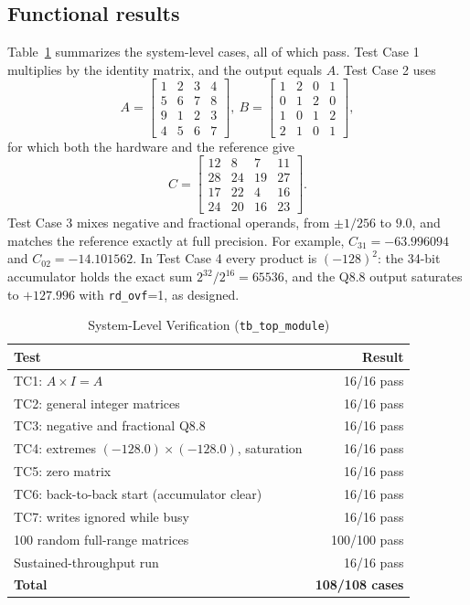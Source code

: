 \documentclass[conference]{IEEEtran}
\begin{document}
\subsection{Functional results}
Table~\ref{tab:tests} summarizes the system-level cases, all of which pass. Test Case 1 multiplies by the identity matrix, and the output equals $A$. Test Case 2 uses
\[
A=\begin{bmatrix}1&2&3&4\\5&6&7&8\\9&1&2&3\\4&5&6&7\end{bmatrix},\ 
B=\begin{bmatrix}1&2&0&1\\0&1&2&0\\1&0&1&2\\2&1&0&1\end{bmatrix},
\]
for which both the hardware and the reference give
\[
C=\begin{bmatrix}12&8&7&11\\28&24&19&27\\17&22&4&16\\24&20&16&23\end{bmatrix}.
\]
Test Case 3 mixes negative and fractional operands, from $\pm1/256$ to $9.0$, and matches the reference exactly at full precision. For example, $C_{31} = -63.996094$ and $C_{02} = -14.101562$. In Test Case 4 every product is $(-128)^2$: the 34-bit accumulator holds the exact sum $2^{32}/2^{16} = 65536$, and the Q8.8 output saturates to $+127.996$ with \texttt{rd\_ovf}=1, as designed.

\begin{table}[t]
\caption{System-Level Verification (\texttt{tb\_top\_module})}
\label{tab:tests}
\centering\footnotesize
\begin{tabular}{@{}lr@{}}
\toprule
Test & Result \\ \midrule
TC1: $A \times I = A$ & 16/16 pass \\
TC2: general integer matrices & 16/16 pass \\
TC3: negative and fractional Q8.8 & 16/16 pass \\
TC4: extremes $(-128.0)\times(-128.0)$, saturation & 16/16 pass \\
TC5: zero matrix & 16/16 pass \\
TC6: back-to-back start (accumulator clear) & 16/16 pass \\
TC7: writes ignored while busy & 16/16 pass \\
100 random full-range matrices & 100/100 pass \\
Sustained-throughput run & 16/16 pass \\ \midrule
\textbf{Total} & \textbf{108/108 cases} \\ \bottomrule
\end{tabular}
\end{table}
\end{document}
